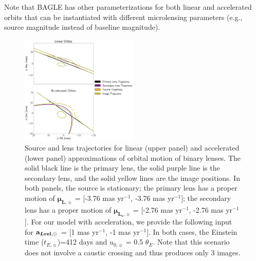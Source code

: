 \documentclass[twocolumn]{aastex701}
\newcommand{\vect}[1]{\boldsymbol{#1}}
\newcommand{\accLsec}{\bold{a}_{\boldsymbol{L\mathrm{rel}},\sun}}
\newcommand{\tE}{t_{E,\sun}}
\newcommand{\thetaE}{\theta_E}
\newcommand{\uo}{u_{0,\sun}}
\newcommand{\mulvec}{\vect{\mu}_{\boldsymbol{L},\sun}}
\newcommand{\mulsvec}{\vect{\mu}_{\boldsymbol{L_s} ,\sun}}
\begin{document}
Note that BAGLE has other parameterizations for both linear and accelerated orbits that can be instantiated with different microlensing parameters (e.g., source magnitude instead of baseline magnitude).





\begin{figure}
    \centering
    \includegraphics[width=0.5\textwidth]{figures/lin_lenses.png}
    \caption{Source and lens trajectories for linear (upper panel) and accelerated (lower panel) approximations of orbital motion of binary lenses. The solid black line is the primary lens, the solid purple line is the secondary lens, and the solid yellow lines are the image positions. In both panels, the source is stationary; the primary lens has a proper motion of $\mulvec$ = [-3.76 mas yr$^{-1}$, -3.76 mas yr$^{-1}$]; the secondary lens has a proper motion of  $\mulsvec$ = [-2.76 mas yr$^{-1}$, -2.76 mas yr$^{-1}$]. For our model with acceleration, we provide the following input for $\accLsec$ = [1 mas yr$^{-1}$, -1 mas yr$^{-1}$]. In both cases, the Einstein time ($\tE$)=412 days and $\uo$ = 0.5 $\thetaE$. Note that this scenario does not involve a caustic crossing and thus produces only 3 images.}
    \label{fig:psbl_linacc}
\end{figure}
\end{document}
